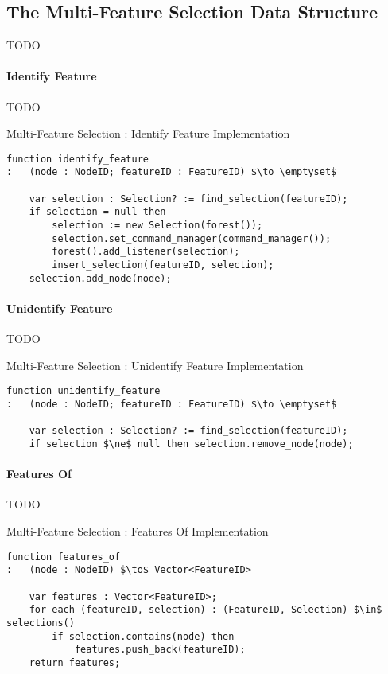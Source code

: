\subsection{The Multi-Feature Selection Data Structure}

TODO

\paragraph{Identify Feature}

TODO

\begin{stulisting}[p]
\caption{Multi-Feature Selection : Identify Feature Implementation}
\label{code:ipfs-mfs-identifyfeature}
\begin{lstlisting}[style=Default]
function identify_feature
:	(node : NodeID; featureID : FeatureID) $\to \emptyset$

	var selection : Selection? := find_selection(featureID);
	if selection = null then
		selection := new Selection(forest());
		selection.set_command_manager(command_manager());
		forest().add_listener(selection);
		insert_selection(featureID, selection);
	selection.add_node(node);
\end{lstlisting}
\end{stulisting}

\paragraph{Unidentify Feature}

TODO

\begin{stulisting}[p]
\caption{Multi-Feature Selection : Unidentify Feature Implementation}
\label{code:ipfs-mfs-unidentifyfeature}
\begin{lstlisting}[style=Default]
function unidentify_feature
:	(node : NodeID; featureID : FeatureID) $\to \emptyset$

	var selection : Selection? := find_selection(featureID);
	if selection $\ne$ null then selection.remove_node(node);
\end{lstlisting}
\end{stulisting}

\paragraph{Features Of}

TODO

\begin{stulisting}[p]
\caption{Multi-Feature Selection : Features Of Implementation}
\label{code:ipfs-mfs-featuresof}
\begin{lstlisting}[style=Default]
function features_of
:	(node : NodeID) $\to$ Vector<FeatureID>

	var features : Vector<FeatureID>;
	for each (featureID, selection) : (FeatureID, Selection) $\in$ selections()
		if selection.contains(node) then
			features.push_back(featureID);
	return features;
\end{lstlisting}
\end{stulisting}

